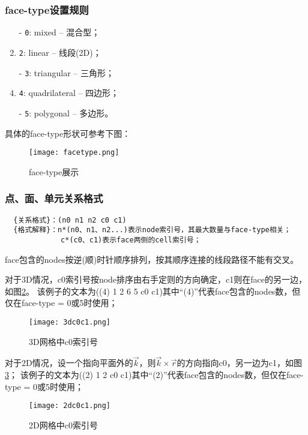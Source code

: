 \documentclass[lang=cn,11pt,a4paper]{elegantpaper} %
\begin{document}
\subsubsection{face-type设置规则}\label{face-type}
\begin{enumerate}
  \item[-] \lstinline{0}: mixed -- 混合型；
  \item[-] \lstinline{2}: linear -- 线段(2D)；
  \item[-] \lstinline{3}: triangular -- 三角形；
  \item[-] \lstinline{4}: quadrilateral -- 四边形；
  \item[-] \lstinline{5}: polygonal -- 多边形。
\end{enumerate}

具体的face-type形状可参考下图：
\begin{figure}[!htb]
  \centering
  \texttt{[image: facetype.png]}
  \caption{face-type展示}
  \label{facetype}
\end{figure}

\subsubsection{点、面、单元关系格式}\label{nodefacecell}
\begin{lstlisting}
  {关系格式}：(n0 n1 n2 c0 c1)
  {格式解释}：n*(n0、n1、n2...)表示node索引号，其最大数量与face-type相关；
             c*(c0、c1)表示face两侧的cell索引号；
\end{lstlisting}

face包含的nodes按逆(顺)时针顺序排列，按其顺序连接的线段路径不能有交叉。

对于3D情况，c0索引号按node排序由右手定则的方向确定，c1则在face的另一边，如图\ref{3dc0c1}。
该例子的文本为((4) 1 2 6 5 c0 c1)其中“(4)”代表face包含的nodes数，但仅在face-type = 0或5时使用；
\begin{figure}[!htb]
  \centering
  \texttt{[image: 3dc0c1.png]}
  \caption{3D网格中c0索引号}
  \label{3dc0c1}
\end{figure}

对于2D情况，设一个指向平面外的$\overrightarrow{k}$，则$\overrightarrow{k}\times\overrightarrow{r}$的方向指向c0，另一边为c1，如图\ref{2dc0c1}；
该例子的文本为((2) 1 2 c0 c1)其中“(2)”代表face包含的nodes数，但仅在face-type = 0或5时使用；
\begin{figure}[!htb]
  \centering
  \texttt{[image: 2dc0c1.png]}
  \caption{2D网格中c0索引号}
  \label{2dc0c1}
\end{figure}
\end{document}
